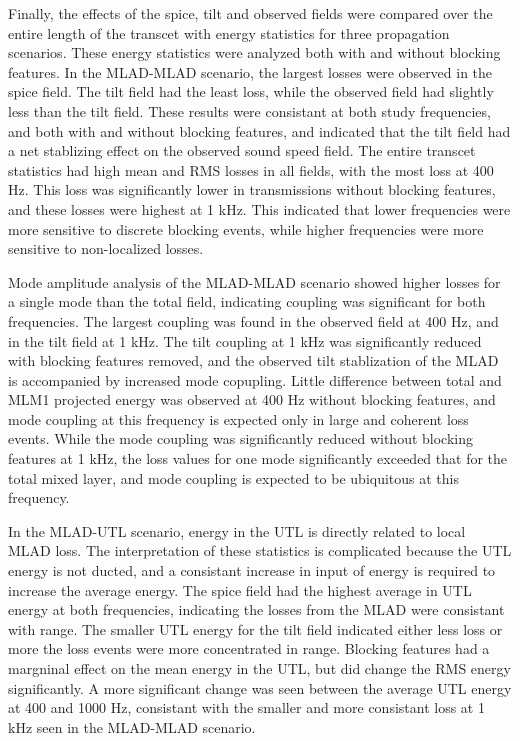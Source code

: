 \documentclass[preprint,NumberedRefs]{JASA}
\begin{document}
Finally, the effects of the spice, tilt and observed fields were compared over the entire length of the transcet with energy statistics for three propagation scenarios. These energy statistics were analyzed both with and without blocking features. In the MLAD-MLAD scenario, the largest losses were observed in the spice field. The tilt field had the least loss, while the observed field had slightly less than the tilt field. These results were consistant at both study frequencies, and both with and without blocking features, and indicated that the tilt field had a net stablizing effect on the observed sound speed field. The entire transcet statistics had high mean and RMS losses in all fields, with the most loss at 400 Hz. This loss was significantly lower in transmissions without blocking features, and these losses were highest at 1 kHz. This indicated that lower frequencies were more sensitive to discrete blocking events, while higher frequencies were more sensitive to non-localized losses.

Mode amplitude analysis of the MLAD-MLAD scenario showed higher losses for a single mode than the total field, indicating coupling was significant for both frequencies. The largest coupling was found in the observed field at 400 Hz, and in the tilt field at 1 kHz. The tilt coupling at 1 kHz was significantly reduced with blocking features removed, and the observed tilt stablization of the MLAD is accompanied by increased mode copupling. Little difference between total and MLM1 projected energy was observed at 400 Hz without blocking features, and mode coupling at this frequency is expected only in large and coherent loss events. While the mode coupling was significantly reduced without blocking features at 1 kHz, the loss values for one mode significantly exceeded that for the total mixed layer, and mode coupling is expected to be ubiquitous at this frequency.

In the MLAD-UTL scenario, energy in the UTL is directly related to local MLAD loss. The interpretation of these statistics is complicated because the UTL energy is not ducted, and a consistant increase in input of energy is required to increase the average energy. The spice field had the highest average in UTL energy at both frequencies, indicating the losses from the MLAD were consistant with range. The smaller UTL energy for the tilt field indicated either less loss or more the loss events were more concentrated in range. Blocking features had a margninal effect on the mean energy in the UTL, but did change the RMS energy significantly. A more significant change was seen between the average UTL energy at 400 and 1000 Hz, consistant with the smaller and more consistant loss at 1 kHz seen in the MLAD-MLAD scenario.
\end{document}
